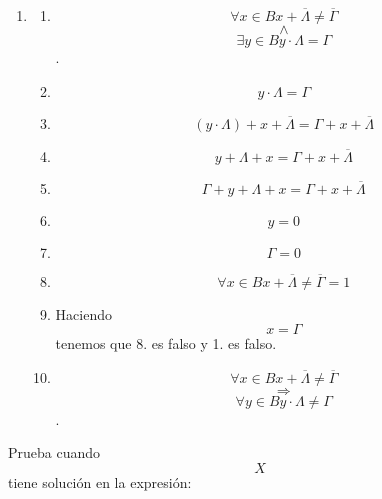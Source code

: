 \begin{enumerate}
\begin{enumerate}
\begin{enumerate}
\begin{enumerate}
\begin{enumerate}
          \begin{enumerate}
          \def\labelenumvi{\arabic{enumvi}.}
          \tightlist
          \item
            \begin{enumerate}
            \def\labelenumvii{\arabic{enumvii}.}
            \tightlist
            \item
              \[\forall{x \in B}{{x + \overline{\Lambda}} \neq \overline{\Gamma}}\]\[\land\]\[\exists{y \in B}{{y \cdot \Lambda} = \Gamma}\].
            \item
              \[{y \cdot \Lambda} = \Gamma\]
            \item
              \[{{{({y \cdot \Lambda})} + x} + \overline{\Lambda}} = {{\Gamma + x} + \overline{\Lambda}}\]
            \item
              \[{{y + \Lambda} + x} = {{\Gamma + x} + \overline{\Lambda}}\]
            \item
              \[{{{\Gamma + y} + \Lambda} + x} = {{\Gamma + x} + \overline{\Lambda}}\]
            \item
              \[y = 0\]
            \item
              \[\Gamma = 0\]
            \item
              \[\forall{x \in B}{{{x + \overline{\Lambda}} \neq \overline{\Gamma}} = 1}\]
            \item
              Haciendo \[x = \Gamma\] tenemos que 8. es falso y 1. es
              falso.
            \item
              \[\forall{x \in B}{{x + \overline{\Lambda}} \neq \overline{\Gamma}}\]\[\Rightarrow\]\[\forall{y \in B}{{y \cdot \Lambda} \neq \Gamma}\].
            \end{enumerate}
          \end{enumerate}

          Prueba cuando \[X\] tiene solución en la expresión:


\end{enumerate}
\end{enumerate}
\end{enumerate}
\end{enumerate}
\end{enumerate}
